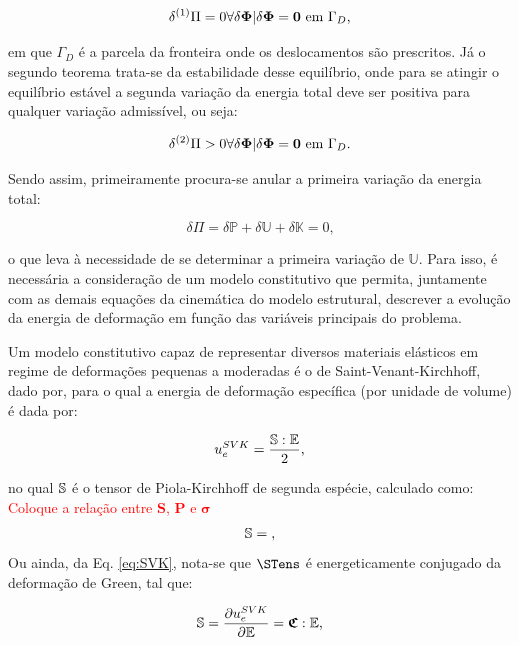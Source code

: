 \begin{equation}
    \delta^{(1)}\Pi=0\forall\delta\boldsymbol{\Phi}|\delta\boldsymbol{\Phi}=\boldsymbol{0}\text{ em }\Gamma_D\text{,}
\end{equation}

\noindent em que $\Gamma_D$ é a parcela da fronteira onde os deslocamentos são prescritos. Já o segundo teorema trata-se da estabilidade desse equilíbrio, onde para se atingir o equilíbrio estável a segunda variação da energia total deve ser positiva para qualquer variação admissível, ou seja:

\begin{equation}
    \delta^{(2)}\Pi>0\forall\delta\boldsymbol{\Phi}|\delta\boldsymbol{\Phi}=\boldsymbol{0}\text{ em }\Gamma_D\text{.}
\end{equation}

Sendo assim, primeiramente procura-se anular a primeira variação da energia total:

\begin{equation}
    \delta\Pi=\delta\mathbb{P}+\delta\mathbb{U}+\delta\mathbb{K}=0\text{,}
\end{equation}

\noindent o que leva à necessidade de se determinar a primeira variação de $\mathbb{U}$. Para isso, é necessária a consideração de um modelo constitutivo que permita, juntamente com as demais equações da cinemática do modelo estrutural, descrever a evolução da energia de deformação em função das variáveis principais do problema. 

Um modelo constitutivo capaz de representar diversos materiais elásticos em regime de deformações pequenas a moderadas é o de Saint-Venant-Kirchhoff, dado por, para o qual a energia de deformação específica (por unidade de volume) é dada por:

\begin{equation}\label{eq:SVK}
    u_e^{SVK}=\frac{\boldsymbol{\mathbb{S}}:\mathbb{E}}{2}\text{,}
\end{equation}

\noindent no qual $\boldsymbol{\mathbb{S}}$ é o tensor de Piola-Kirchhoff de segunda espécie, calculado como:
\textcolor{red}{Coloque a relação entre $\mathbf{S}$, $\mathbf{P}$ e $\boldsymbol{\sigma}$}
\begin{equation}
    \boldsymbol{\mathbb{S}}=\text{,}
    \label{eq:CSD-S0}
\end{equation}
Ou ainda, da Eq. \eqref{eq:SVK}, nota-se que $\STens$ é energeticamente conjugado da deformação de Green, tal que:

\begin{equation}
    \boldsymbol{\mathbb{S}}=\frac{\partial u_e^{SVK}}{\partial \mathbb{E}}=\boldsymbol{\mathfrak{C}}:\mathbb{E}\text{,}
    \label{eq:CSD-S}
\end{equation}


